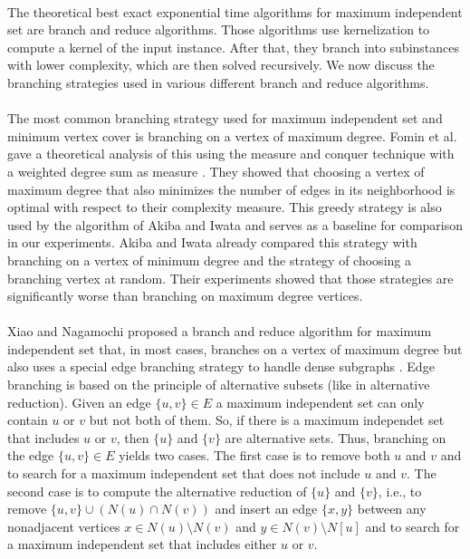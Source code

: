 \documentclass[]{article}
\begin{document}
\paragraph{}
The theoretical best exact exponential time algorithms for maximum independent set are branch and reduce algorithms. Those algorithms use kernelization to compute a kernel of the input instance. After that, they branch into subinstances with lower complexity, which are then solved recursively. We now discuss the branching strategies used in various different branch and reduce algorithms.

\paragraph{}
The most common branching strategy used for maximum independent set and minimum vertex cover is branching on a vertex of maximum degree. Fomin et al. gave a theoretical analysis of this using the measure and conquer technique with a weighted degree sum as measure \cite{Fomin}. They showed that choosing a vertex of maximum degree that also minimizes the number of edges in its neighborhood is optimal with respect to their complexity measure. This greedy strategy is also used by the algorithm of Akiba and Iwata\cite{AkibaIwata} and serves as a baseline for comparison in our experiments. Akiba and Iwata already compared this strategy with branching on a vertex of minimum degree and the strategy of choosing a branching vertex at random. Their experiments showed that those strategies are significantly worse than branching on maximum degree vertices.\paragraph{}
Xiao and Nagamochi proposed a branch and reduce algorithm for maximum independent set that, in most cases, branches on a vertex of maximum degree but also uses a special edge branching strategy to handle dense subgraphs \cite{XiaoNagamochi}. Edge branching is based on the principle of alternative subsets (like in alternative reduction). Given an edge $\{u,v\}\in E$ a maximum independent set can only contain $u$ or $v$ but not both of them. So, if there is a maximum independet set that includes $u$ or $v$, then $\{u\}$ and $\{v\}$ are alternative sets. Thus, branching on the edge $\{u,v\}\in E$ yields two cases. The first case is to remove both $u$ and $v$ and to search for a maximum independent set that does not include $u$ and $v$. The second case is to compute the alternative reduction of $\{u\}$ and $\{v\}$, i.e., to remove $\{u,v\}\cup(N(u)\cap N(v))$ and insert an edge $\{x,y\}$ between any nonadjacent vertices $x\in N(u)\setminus N(v)$ and $y\in N(v)\setminus N[u]$ and to search for a maximum independent set that includes either $u$ or $v$.\\
\end{document}
